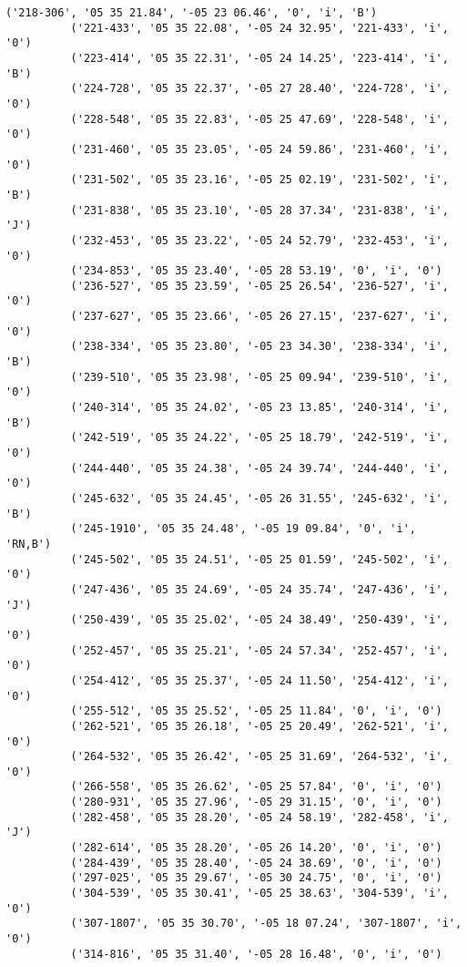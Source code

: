 \documentclass{article}
\begin{document}
\begin{Verbatim}[commandchars=\\\{\}]
          ('218-306', '05 35 21.84', '-05 23 06.46', '0', 'i', 'B')
          ('221-433', '05 35 22.08', '-05 24 32.95', '221-433', 'i', '0')
          ('223-414', '05 35 22.31', '-05 24 14.25', '223-414', 'i', 'B')
          ('224-728', '05 35 22.37', '-05 27 28.40', '224-728', 'i', '0')
          ('228-548', '05 35 22.83', '-05 25 47.69', '228-548', 'i', '0')
          ('231-460', '05 35 23.05', '-05 24 59.86', '231-460', 'i', '0')
          ('231-502', '05 35 23.16', '-05 25 02.19', '231-502', 'i', 'B')
          ('231-838', '05 35 23.10', '-05 28 37.34', '231-838', 'i', 'J')
          ('232-453', '05 35 23.22', '-05 24 52.79', '232-453', 'i', '0')
          ('234-853', '05 35 23.40', '-05 28 53.19', '0', 'i', '0')
          ('236-527', '05 35 23.59', '-05 25 26.54', '236-527', 'i', '0')
          ('237-627', '05 35 23.66', '-05 26 27.15', '237-627', 'i', '0')
          ('238-334', '05 35 23.80', '-05 23 34.30', '238-334', 'i', 'B')
          ('239-510', '05 35 23.98', '-05 25 09.94', '239-510', 'i', '0')
          ('240-314', '05 35 24.02', '-05 23 13.85', '240-314', 'i', 'B')
          ('242-519', '05 35 24.22', '-05 25 18.79', '242-519', 'i', '0')
          ('244-440', '05 35 24.38', '-05 24 39.74', '244-440', 'i', '0')
          ('245-632', '05 35 24.45', '-05 26 31.55', '245-632', 'i', 'B')
          ('245-1910', '05 35 24.48', '-05 19 09.84', '0', 'i', 'RN,B')
          ('245-502', '05 35 24.51', '-05 25 01.59', '245-502', 'i', '0')
          ('247-436', '05 35 24.69', '-05 24 35.74', '247-436', 'i', 'J')
          ('250-439', '05 35 25.02', '-05 24 38.49', '250-439', 'i', '0')
          ('252-457', '05 35 25.21', '-05 24 57.34', '252-457', 'i', '0')
          ('254-412', '05 35 25.37', '-05 24 11.50', '254-412', 'i', '0')
          ('255-512', '05 35 25.52', '-05 25 11.84', '0', 'i', '0')
          ('262-521', '05 35 26.18', '-05 25 20.49', '262-521', 'i', '0')
          ('264-532', '05 35 26.42', '-05 25 31.69', '264-532', 'i', '0')
          ('266-558', '05 35 26.62', '-05 25 57.84', '0', 'i', '0')
          ('280-931', '05 35 27.96', '-05 29 31.15', '0', 'i', '0')
          ('282-458', '05 35 28.20', '-05 24 58.19', '282-458', 'i', 'J')
          ('282-614', '05 35 28.20', '-05 26 14.20', '0', 'i', '0')
          ('284-439', '05 35 28.40', '-05 24 38.69', '0', 'i', '0')
          ('297-025', '05 35 29.67', '-05 30 24.75', '0', 'i', '0')
          ('304-539', '05 35 30.41', '-05 25 38.63', '304-539', 'i', '0')
          ('307-1807', '05 35 30.70', '-05 18 07.24', '307-1807', 'i', '0')
          ('314-816', '05 35 31.40', '-05 28 16.48', '0', 'i', '0')

\end{Verbatim}
\end{document}
